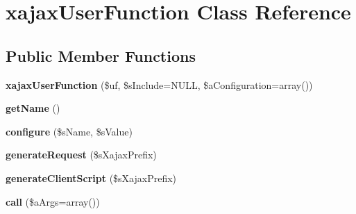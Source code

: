 \hypertarget{classxajaxUserFunction}{
\section{xajaxUserFunction Class Reference}
\label{classxajaxUserFunction}
}
\subsection*{Public Member Functions}
\begin{DoxyCompactItemize}
\item 
\hypertarget{classxajaxUserFunction_abe82479aba3056595ba92d0c3ed2d349}{
{\bfseries xajaxUserFunction} (\$uf, \$sInclude=NULL, \$aConfiguration=array())}
\label{classxajaxUserFunction_abe82479aba3056595ba92d0c3ed2d349}

\item 
\hypertarget{classxajaxUserFunction_a2a8ecaee2cc02484bd21bc6c2d832f4a}{
{\bfseries getName} ()}
\label{classxajaxUserFunction_a2a8ecaee2cc02484bd21bc6c2d832f4a}

\item 
\hypertarget{classxajaxUserFunction_ad6c1cebd25703d65d10f509895c7a1f5}{
{\bfseries configure} (\$sName, \$sValue)}
\label{classxajaxUserFunction_ad6c1cebd25703d65d10f509895c7a1f5}

\item 
\hypertarget{classxajaxUserFunction_a2e34b16c01f1aec68ea2d8f32d21740b}{
{\bfseries generateRequest} (\$sXajaxPrefix)}
\label{classxajaxUserFunction_a2e34b16c01f1aec68ea2d8f32d21740b}

\item 
\hypertarget{classxajaxUserFunction_ace6643cd695c20fc57f67a7fae1786d0}{
{\bfseries generateClientScript} (\$sXajaxPrefix)}
\label{classxajaxUserFunction_ace6643cd695c20fc57f67a7fae1786d0}

\item 
\hypertarget{classxajaxUserFunction_a43e93f53210c2ea935228626c829cb51}{
{\bfseries call} (\$aArgs=array())}
\label{classxajaxUserFunction_a43e93f53210c2ea935228626c829cb51}

\end{DoxyCompactItemize}
